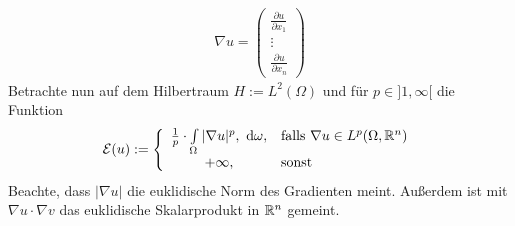 \begin{beispiel}
\begin{align*}
\nabla u=\begin{pmatrix}
\frac{\partial u}{\partial x_1}\\
\vdots\\
\frac{\partial u}{\partial x_n}
\end{pmatrix}
\end{align*}
Betrachte nun auf dem Hilbertraum $H:=L^2(\Omega)$ und für $p\in]1,\infty[$ die Funktion
\begin{align*}
\mathcal{E}(u):=\left\lbrace\begin{array}{cl}
\frac{1}{p}\cdot\int\limits_\Omega |\nabla u|^p,\text{ d}\omega, &\text{falls } \nabla u\in L^p(\Omega,\mathbb{R}^n)\\
+\infty, &\text{sonst }
\end{array}\right.
\end{align*}
Beachte, dass $|\nabla u|$ die euklidische Norm des Gradienten meint. Außerdem ist mit $\nabla u\cdot\nabla v$ das euklidische Skalarprodukt in $\mathbb{R}^n$ gemeint.


\end{beispiel}
